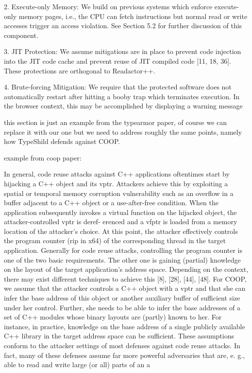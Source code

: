2. Execute-only Memory: We build on previous systems
which enforce execute-only memory pages, i.e., the
CPU can fetch instructions but normal read or write
accesses trigger an access violation. See Section 5.2 for
further discussion of this component.

3. JIT Protection: We assume mitigations are in place
to prevent code injection into the JIT code cache and
prevent reuse of JIT compiled code [11, 18, 36]. These
protections are orthogonal to Readactor++.

4. Brute-forcing Mitigation: We require that the protected
software does not automatically restart after
hitting a booby trap which terminates execution. In
the browser context, this may be accomplished by displaying
a warning message

this section is just an example from the typearmor paper, of course we can 
replace it with our one but we need to address roughly the same points, namely
how TypeShild defends against COOP.

example from coop paper:

In general, code reuse attacks against C++ applications
oftentimes start by hijacking a C++ object and its vptr.
Attackers achieve this by exploiting a spatial or temporal
memory corruption vulnerability such as an overflow in a
buffer adjacent to a C++ object or a use-after-free condition.
When the application subsequently invokes a virtual function
on the hijacked object, the attacker-controlled vptr is deref-
erenced and a vfptr is loaded from a memory location of the
attacker’s choice. At this point, the attacker effectively controls
the program counter (rip in x64) of the corresponding thread
in the target application. Generally for code reuse attacks,
controlling the program counter is one of the two basic
requirements. The other one is gaining (partial) knowledge on
the layout of the target application’s address space. Depending
on the context, there may exist different techniques to achieve
this [8], [28], [44], [48].
For COOP, we assume that the attacker controls a C++
object with a vptr and that she can infer the base address of
this object or another auxiliary buffer of sufficient size under
her control. Further, she needs to be able to infer the base
addresses of a set of C++ modules whose binary layouts are
(partly) known to her. For instance, in practice, knowledge on
the base address of a single publicly available C++ library in
the target address space can be sufficient.
These assumptions conform to the attacker settings of most
defenses against code reuse attacks. In fact, many of these
defenses assume far more powerful adversaries that are, e. g.,
able to read and write large (or all) parts of an a

